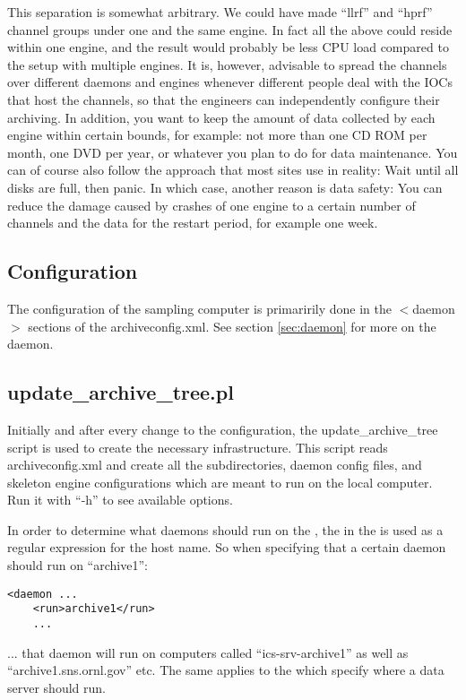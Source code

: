 This separation is somewhat arbitrary. We could have made ``llrf'' and
``hprf'' channel groups under one and the same engine. In fact all the
above could reside within one engine, and the result would probably be
less CPU load compared to the setup with multiple engines.  It is,
however, advisable to spread the channels over different daemons and
engines whenever different people deal with the IOCs that host the
channels, so that the engineers can independently configure their
archiving.  In addition, you want to keep the amount of data collected
by each engine within certain bounds, for example: not more than one
CD ROM per month, one DVD per year, or whatever you plan to do for
data maintenance. You can of course also follow the approach that most
sites use in reality: Wait until all disks are full, then panic.
In which case, another reason is data safety: You can reduce the
damage caused by crashes of one engine to a certain number of channels
and the data for the restart period, for example one week.

\subsection{Configuration}
The configuration of the sampling computer is primaririly done
in the $<$daemon$>$ sections of the archiveconfig.xml.
See section \ref{sec:daemon} for more on the daemon.

\subsection{update\_archive\_tree.pl}
Initially and after every change to the configuration,
the update\_archive\_tree script is used to create the necessary infrastructure.
This script reads archiveconfig.xml and create all the subdirectories,
daemon config files, and skeleton engine configurations which are
meant to run on the local computer.
Run it with ``-h'' to see available options.

\NOTE In order to determine what daemons should run on the
,
the  in the  is used as a
regular expression for the host name.
So when specifying that a certain daemon should run on ``archive1'':
\begin{lstlisting}[keywordstyle=\sffamily]
 <daemon ...
    <run>archive1</run>
    ...
\end{lstlisting}
... that daemon will run on computers called ``ics-srv-archive1'' as well
as ``archive1.sns.ornl.gov'' etc.
The same applies to the  which specify where a
data server should run.


